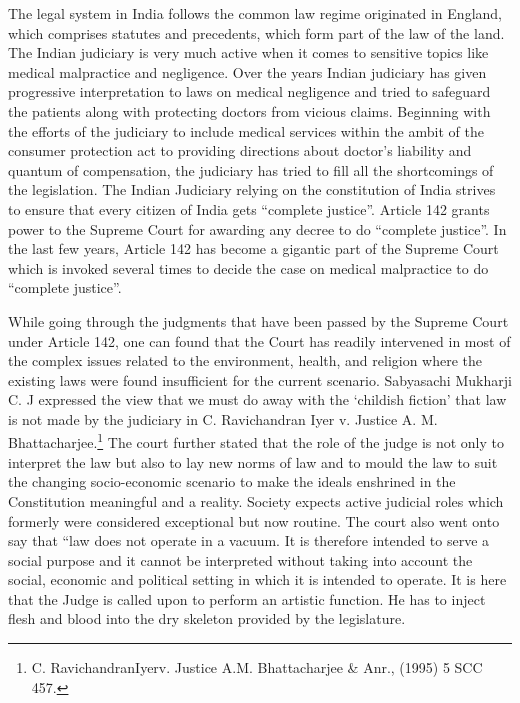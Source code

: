 \begin{multicols}{2}
\noi
The legal system in India follows the common law regime originated in England, which comprises
statutes and precedents, which form part of the law of the land. The Indian judiciary is very much 
active when it comes to sensitive topics like medical malpractice and negligence. Over the years
Indian judiciary has given progressive interpretation to laws on medical negligence and tried to
safeguard the patients along with protecting doctors from vicious claims. Beginning with the
efforts of the judiciary to include medical services within the ambit of the consumer protection
act to providing directions about doctor’s liability and quantum of compensation, the judiciary
has tried to fill all the shortcomings of the legislation. The Indian Judiciary relying on the
constitution of India strives to ensure that every citizen of India gets “complete justice”. Article
142 grants power to the Supreme Court for awarding any decree to do “complete justice”. In the
last few years, Article 142 has become a gigantic part of the Supreme Court which is invoked
several times to decide the case on medical malpractice to do “complete justice”.

\vspace{-.1cm}

\noi
While going through the judgments that have been passed by the Supreme Court under Article
142, one can found that the Court has readily intervened in most of the complex issues related to
the environment, health, and religion where the existing laws were found insufficient for the
current scenario. Sabyasachi Mukharji C. J expressed the view that we must do away with the
‘childish fiction' that law is not made by the judiciary in C. Ravichandran Iyer v. Justice A. M.
Bhattacharjee.\footnote{C. RavichandranIyerv. Justice A.M. Bhattacharjee \& Anr., (1995) 5 SCC 457.} The court further stated that the role of the judge is not only to interpret the law
but also to lay new norms of law and to mould the law to suit the changing socio-economic
scenario to make the ideals enshrined in the Constitution meaningful and a reality. Society expects
active judicial roles which formerly were considered exceptional but now routine. The court also
went onto say that “law does not operate in a vacuum. It is therefore intended to serve a social
purpose and it cannot be interpreted without taking into account the social, economic and political
setting in which it is intended to operate. It is here that the Judge is called upon to perform an
artistic function. He has to inject flesh and blood into the dry skeleton provided by the legislature.


\end{multicols}
